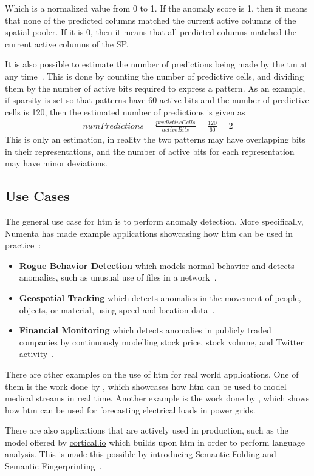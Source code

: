 Which is a normalized value from 0 to 1. If the anomaly score is 1, then it means that none of the predicted columns matched the current active columns of the spatial pooler. If it is 0, then it means that all predicted columns matched the current active columns of the SP.\par
It is also possible to estimate the number of predictions being made by the \gls*{tm} at any time~\cite{htm_predictions_count}. This is done by counting the number of predictive cells, and dividing them by the number of active bits required to express a pattern. As an example, if sparsity is set so that patterns have 60 active bits and the number of predictive cells is 120, then the estimated number of predictions is given as
\begin{align*}
    numPredictions=\frac{predictiveCells}{activeBits}=\frac{120}{60}=2
\end{align*}
This is only an estimation, in reality the two patterns may have overlapping bits in their representations, and the number of active bits for each representation may have minor deviations.
\subsection{Use Cases}
The general use case for \gls*{htm} is to perform anomaly detection. More specifically, Numenta has made example applications showcasing how \gls*{htm} can be used in practice~\cite{numenta_example_apps}:
\begin{itemize}
    \item \textbf{Rogue Behavior Detection} which models normal behavior and detects anomalies, such as unusual use of files in a network~\cite{htm_rogue}.
    \item \textbf{Geospatial Tracking} which detects anomalies in the movement of people, objects, or material, using speed and location data~\cite{htm_geospatial}.
    \item \textbf{Financial Monitoring} which detects anomalies in publicly traded companies by continuously modelling stock price, stock volume, and Twitter activity~\cite{htm_finance}.
\end{itemize}
There are other examples on the use of \gls*{htm} for real world applications. One of them is the work done by \textcite{htm_medicine}, which showcases how \gls*{htm} can be used to model medical streams in real time. Another example is the work done by \textcite{htm_electrical_load}, which shows how \gls*{htm} can be used for forecasting electrical loads in power grids.
\par
There are also applications that are actively used in production, such as the model offered by \href{www.cortical.io}{cortical.io} which builds upon \gls*{htm} in order to perform language analysis. This is made this possible by introducing Semantic Folding and Semantic Fingerprinting~\cite{semantic_folding}.
